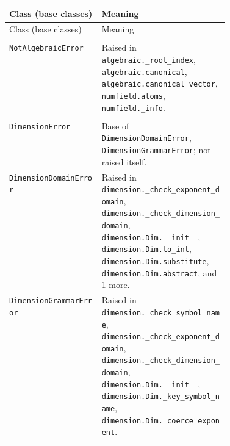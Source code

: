 {\small
\begin{xltabular}{\linewidth}{@{}>{\raggedright\arraybackslash}p{0.42\linewidth}X@{}}
\toprule
Class (base classes) & Meaning \\
\midrule
\endfirsthead
\toprule
Class (base classes) & Meaning \\
\midrule
\endhead
\bottomrule
\endfoot

\\*
\texttt{NotAlgebraicError}\newline{} & Raised in \texttt{algebraic.\allowbreak{}\_\allowbreak{}root\_\allowbreak{}index}, \texttt{algebraic.\allowbreak{}canonical}, \texttt{algebraic.\allowbreak{}canonical\_\allowbreak{}vector}, \texttt{numfield.\allowbreak{}atoms}, \texttt{numfield.\allowbreak{}\_\allowbreak{}info}. \\
\midrule
{}\\*
\texttt{DimensionError}\newline{} & Base of \texttt{DimensionDomainError}, \texttt{DimensionGrammarError}; not raised itself. \\
\texttt{DimensionDomainError}\newline{} & Raised in \texttt{dimension.\allowbreak{}\_\allowbreak{}check\_\allowbreak{}exponent\_\allowbreak{}domain}, \texttt{dimension.\allowbreak{}\_\allowbreak{}check\_\allowbreak{}dimension\_\allowbreak{}domain}, \texttt{dimension.\allowbreak{}Dim.\allowbreak{}\_\allowbreak{}\_\allowbreak{}init\_\allowbreak{}\_\allowbreak{}}, \texttt{dimension.\allowbreak{}Dim.\allowbreak{}to\_\allowbreak{}int}, \texttt{dimension.\allowbreak{}Dim.\allowbreak{}substitute}, \texttt{dimension.\allowbreak{}Dim.\allowbreak{}abstract}, and 1 more. \\
\texttt{DimensionGrammarError}\newline{} & Raised in \texttt{dimension.\allowbreak{}\_\allowbreak{}check\_\allowbreak{}symbol\_\allowbreak{}name}, \texttt{dimension.\allowbreak{}\_\allowbreak{}check\_\allowbreak{}exponent\_\allowbreak{}domain}, \texttt{dimension.\allowbreak{}\_\allowbreak{}check\_\allowbreak{}dimension\_\allowbreak{}domain}, \texttt{dimension.\allowbreak{}Dim.\allowbreak{}\_\allowbreak{}\_\allowbreak{}init\_\allowbreak{}\_\allowbreak{}}, \texttt{dimension.\allowbreak{}Dim.\allowbreak{}\_\allowbreak{}key\_\allowbreak{}symbol\_\allowbreak{}name}, \texttt{dimension.\allowbreak{}Dim.\allowbreak{}\_\allowbreak{}coerce\_\allowbreak{}exponent}. \\

\end{xltabular}}
